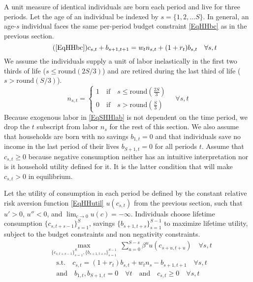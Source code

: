 \documentclass[letterpaper,12pt]{article}
\theoremstyle{definition}
\numberwithin{equation}{section}
\numberwithin{exercise}{section}
\begin{document}
\begin{spacing}{1.5}
      A unit measure of identical individuals are born each period and live for three periods. Let the age of an individual be indexed by $s = \{1,2,...S\}$. In general, an age-$s$ individual faces the same per-period budget constraint \eqref{EqHHbc} as in the previous section.
      \begin{equation}\tag{\ref{EqHHbc}}
         c_{s,t} + b_{s+1,t+1} = w_t n_{s,t} + (1 + r_{t})b_{s,t} \quad\forall s,t
      \end{equation}
      We assume the individuals supply a unit of labor inelastically in the first two thirds of life ($s\leq \text{round}(2S/3)$) and are retired during the last third of life ($s>\text{round}(S/3)$).
      \begin{equation}\label{EqSHHlab}
         n_{s,t} = \begin{cases}
                      1\quad\text{if}\quad s\leq \text{round}\left(\frac{2S}{3}\right) \\
                      0\quad\text{if}\quad s> \text{round}\left(\frac{S}{3}\right)
                   \end{cases} \quad\forall s,t
      \end{equation}
      Because exogenous labor in \eqref{EqSHHlab} is not dependent on the time period, we drop the $t$ subscript from labor $n_s$ for the rest of this section. We also assume that households are born with no savings $b_{1,t} = 0$ and that individuals save no income in the last period of their lives $b_{S+1,t}=0$ for all periods $t$. Assume that $c_{s,t}\geq 0$ because negative consumption neither has an intuitive interpretation nor is it household utility defined for it. It is the latter condition that will make $c_{s,t}>0$ in equilibrium.

      Let the utility of consumption in each period be defined by the constant relative risk aversion function \eqref{EqHHutil} $u(c_{s,t})$ from the previous section, such that $u'>0$, $u''<0$, and $\lim_{c\rightarrow 0}u(c) = -\infty$. Individuals choose lifetime consumption $\{c_{s,t+s-1}\}_{s=1}^S$, savings $\{b_{s+1,t+s}\}_{s=1}^{S-1}$ to maximize lifetime utility, subject to the budget constraints and non negativity constraints.
      \begin{equation}\label{EqSHHmaxprob}
         \begin{split}
            &\max_{\{c_{s,t+s-1}\}_{s=1}^S,\{b_{s+1,t+s}\}_{s=1}^{S-1}}\:\sum_{u=0}^{S-s}\beta^u u(c_{s+u,t+u}) \quad\forall s,t \\
            &\quad\text{s.t.}\quad c_{s,t} = (1 + r_t)b_{s,t} + w_{t}n_s - b_{s+1,t+1} \quad\forall s,t \\
            &\quad\text{and}\quad b_{1,t},b_{S+1,t}=0 \quad\forall t \quad\text{and}\quad c_{s,t}\geq 0 \quad\forall s,t
         \end{split}
      \end{equation}


\end{spacing}
\end{document}
